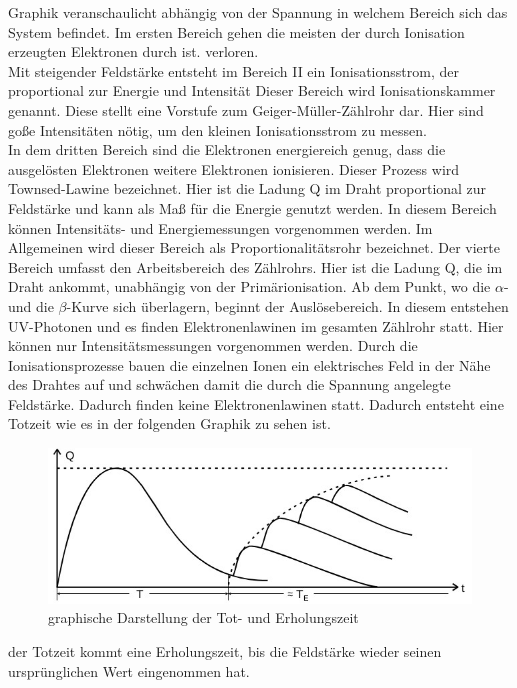 \justifying Graphik veranschaulicht abhängig von der Spannung in welchem Bereich sich das System befindet.
Im ersten Bereich gehen die meisten der durch Ionisation erzeugten Elektronen durch  ist.
verloren. \\
Mit steigender Feldstärke entsteht im Bereich II ein Ionisationsstrom, der proportional zur Energie und Intensität
Dieser Bereich wird Ionisationskammer genannt. Diese stellt eine Vorstufe zum Geiger-Müller-Zählrohr dar.
Hier sind goße Intensitäten nötig, um den kleinen Ionisationsstrom zu messen.\\
In dem dritten Bereich sind die Elektronen energiereich genug, dass die ausgelösten Elektronen
weitere Elektronen ionisieren. Dieser Prozess wird Townsed-Lawine bezeichnet. Hier
ist die Ladung Q im Draht proportional zur Feldstärke und kann als Maß für die
Energie genutzt werden. In diesem Bereich können Intensitäts- und Energiemessungen
vorgenommen werden. Im Allgemeinen wird dieser Bereich als Proportionalitätsrohr bezeichnet.
Der vierte Bereich umfasst den Arbeitsbereich des Zählrohrs. Hier ist die Ladung Q, die im Draht
ankommt, unabhängig von der Primärionisation. 
Ab dem Punkt, wo die $\alpha $- und die $\beta$-Kurve sich überlagern, beginnt der Auslösebereich.
In diesem entstehen UV-Photonen und es finden Elektronenlawinen im gesamten Zählrohr statt.
Hier können nur Intensitätsmessungen vorgenommen werden.
Durch die Ionisationsprozesse bauen die einzelnen Ionen ein elektrisches Feld in der Nähe des
Drahtes auf und schwächen damit die durch die Spannung angelegte Feldstärke. Dadurch finden
keine Elektronenlawinen statt. Dadurch entsteht eine Totzeit wie es in der folgenden Graphik 
zu sehen ist. \cite{V703}
\begin{figure}[H]
    \centering
    \includegraphics[width=\linewidth]{images/totzeit.jpg}
    \caption{graphische Darstellung der Tot- und Erholungszeit}
    \label{fig:3}
\end{figure}
\justifying der Totzeit kommt eine Erholungszeit, bis die Feldstärke wieder seinen ursprünglichen Wert eingenommen hat.
